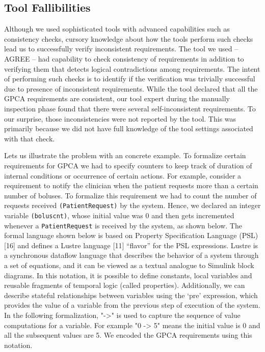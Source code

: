 \subsection{Tool Fallibilities}

Although we used sophisticated tools with advanced capabilities such as consistency checks, cursory knowledge about how the tools perform such checks lead us to successfully verify inconsistent requirements. The tool we used -- AGREE -- had capability to check consistency of requirements in addition to verifying them that detects logical contradictions among requirements. The intent of performing such checks is to identify if the verification was trivially successful due to presence of inconsistent requirements. While the tool declared that all the GPCA requirements are consistent, our tool expert during the manually inspection phase found that there were several self-inconsistent requirements. To our surprise, those inconsistencies were not reported by the tool. This was primarily because we did not have full knowledge of the tool settings associated with that check.

Lets us illustrate the problem with an concrete example. To formalize certain requirements for GPCA we had to specify counters to keep track of duration of internal conditions or occurrence of certain actions. For example, consider a requirement to notify the clinician when the patient requests more than a certain number of boluses. To formalize this requirement we had to count the number of requests received \texttt{(PatientRequest)} by the system. Hence, we declared an integer variable \texttt{(boluscnt)}, whose initial value was 0 and then gets incremented whenever a \texttt{PatientRequest} is received by the system, as shown below. The formal language shown below is based on Property Specification Language (PSL) [16] and defines a Lustre language
[11] “flavor” for the PSL expressions. Lustre is a synchronous dataflow language that describes the behavior of a system through a set of equations, and it can be viewed as a textual analogue to Simulink block diagrams. In this notation, it is possible to define constants, local variables and reusable fragments of temporal logic (called properties). Additionally, we can describe stateful relationships between variables using
the `pre' expression, which provides the value of a variable from the previous step of execution of the system. In the following formalization, "->" is used to capture the sequence of value computations for a variable. For example "0 -> 5" means the initial value is 0 and all the subsequent values are 5. We encoded the GPCA requirements using this notation.

